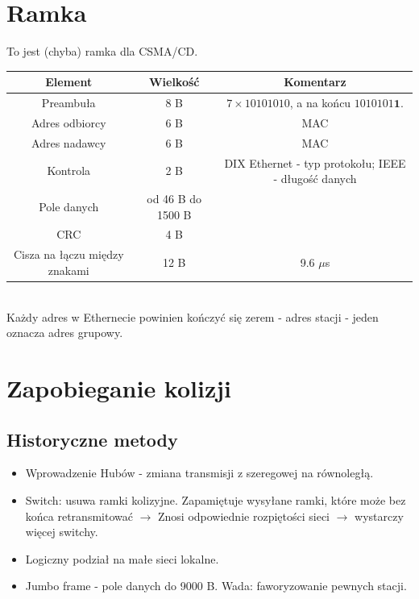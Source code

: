 	\section{Ramka}
		To jest (chyba) ramka dla CSMA/CD.\\
		\begin{table}[h]
			\begin{tabular}{|c|c|c|}
				\hline
				\textbf{Element} & Wielkość & \textbf{Komentarz} \\ \hline
				\multicolumn{1}{|c|}{Preambuła} 	& 8 B & $ 7\times 10101010$, a na końcu $ 1010101\textbf{1} $. \\ \hline
				\multicolumn{1}{|c|}{Adres odbiorcy}	& 6 B &	MAC \\ \hline
				\multicolumn{1}{|c|}{Adres nadawcy}	& 6 B &	MAC \\ \hline
				\multicolumn{1}{|c|}{Kontrola}		& 2 B & DIX Ethernet - typ protokołu; IEEE - długość danych	\\ \hline
				\multicolumn{1}{|c|}{Pole danych}	& od 46 B do 1500 B	& \\ \hline
				\multicolumn{1}{|c|}{CRC}			& 4 B & \\ \hline
				Cisza na łączu między znakami		& 12 B & 9.6 $ \mu $s \\ \hline
			\end{tabular}
		\end{table}\\
		Każdy adres w Ethernecie powinien kończyć się zerem - adres stacji - jeden oznacza adres grupowy.
	\section{Zapobieganie kolizji}
		\subsection{Historyczne metody}
			\begin{itemize}
				\item Wprowadzenie Hubów - zmiana transmisji z szeregowej na równoległą.
				\item Switch: usuwa ramki kolizyjne. Zapamiętuje wysyłane ramki, które może bez końca retransmitować $ \rightarrow $ Znosi odpowiednie rozpiętości sieci $ \rightarrow $ wystarczy więcej switchy.
				\item Logiczny podział na małe sieci lokalne.
				\item Jumbo frame - pole danych do 9000 B. Wada: faworyzowanie pewnych stacji.
			\end{itemize}
